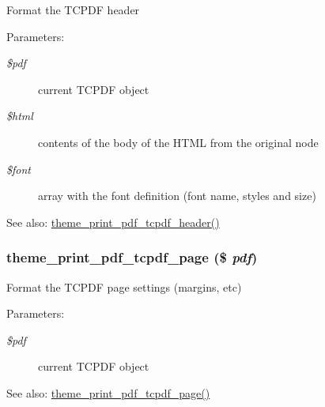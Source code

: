 Format the TCPDF header

\begin{Desc}
\item[Parameters:]
\begin{description}
\item[{\em \$pdf}]current TCPDF object \item[{\em \$html}]contents of the body of the HTML from the original node \item[{\em \$font}]array with the font definition (font name, styles and size) \end{description}
\end{Desc}
\begin{Desc}
\item[See also:]\hyperlink{print__pdf_8pages_8inc_2d29742376ed00838f80a3920bc8c37b}{theme\_\-print\_\-pdf\_\-tcpdf\_\-header()} \end{Desc}
\hypertarget{print__pdf_8pages_8inc_f65ec1857a5d03a1afc62b5f6d02125d}{
\subsubsection[{theme\_\-print\_\-pdf\_\-tcpdf\_\-page}]{\setlength{\rightskip}{0pt plus 5cm}theme\_\-print\_\-pdf\_\-tcpdf\_\-page (\$ {\em pdf})}}
\label{print__pdf_8pages_8inc_f65ec1857a5d03a1afc62b5f6d02125d}


Format the TCPDF page settings (margins, etc)

\begin{Desc}
\item[Parameters:]
\begin{description}
\item[{\em \$pdf}]current TCPDF object \end{description}
\end{Desc}
\begin{Desc}
\item[See also:]\hyperlink{print__pdf_8pages_8inc_f65ec1857a5d03a1afc62b5f6d02125d}{theme\_\-print\_\-pdf\_\-tcpdf\_\-page()} \end{Desc}
